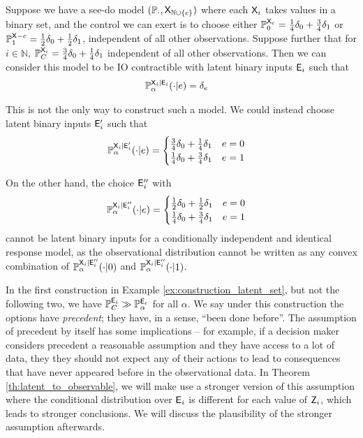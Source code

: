 \begin{example}\label{ex:construction_latent_set}
Suppose we have a see-do model $(\mathbb{P}_\cdot, \mathsf{X}_{\mathbb{N}\cup\{c\}})$ where each $\mathsf{X}_i$ takes values in a binary set, and the control we can exert is to choose either $\mathbb{P}_{0}^{\mathsf{X}_c} = \frac{1}{4}\delta_0 + \frac{3}{4}\delta_1$ or $\mathbb{P}_{1}^{\mathsf{X}-c} = \frac{1}{2}\delta_0 + \frac{1}{2}\delta_1$, independent of all other observations. Suppose further that for $i\in \mathbb{N}$, $\mathbb{P}_C^{\mathsf{X}_i}=\frac{3}{4}\delta_0 + \frac{1}{4}\delta_1$ independent of all other observations. Then we can consider this model to be IO contractible with latent binary inputs $\mathsf{E}_i$ such that
\begin{align}
	\mathbb{P}_\alpha^{\mathsf{X}_i|\mathsf{E}_i}(\cdot|e) &= \delta_e
\end{align}

This is not the only way to construct such a model. We could instead choose latent binary inputs $\mathsf{E}_i'$ such that
\begin{align}
	\mathbb{P}_\alpha^{\mathsf{X}_i|\mathsf{E}_i'}(\cdot|e) &= \begin{cases}
		\frac{3}{4}\delta_0 + \frac{1}{4}\delta_1 & e=0 \\
		\frac{1}{4}\delta_0 + \frac{3}{4}\delta_1 & e=1
	\end{cases}
\end{align}

On the other hand, the choice $\mathsf{E}_i^{\prime\prime}$ with
\begin{align}
	\mathbb{P}_\alpha^{\mathsf{X}_i|\mathsf{E}_i''}(\cdot|e) &= \begin{cases}
		\frac{1}{2}\delta_0 + \frac{1}{2}\delta_1 & e=0 \\
		\frac{1}{4}\delta_0 + \frac{3}{4}\delta_1 & e=1
	\end{cases}
\end{align}
cannot be latent binary inputs for a conditionally independent and identical response model, as the observational distribution cannot be written as any convex combination of $\mathbb{P}_\alpha^{\mathsf{X}_i|\mathsf{E}_i''}(\cdot|0)$ and $\mathbb{P}_\alpha^{\mathsf{X}_i|\mathsf{E}_i''}(\cdot|1)$.
\end{example}

In the first construction in Example \ref{ex:construction_latent_set}, but not the following two, we have $\mathbb{P}_C^{\mathsf{E}_i} \gg \mathbb{P}_\alpha^{\mathsf{E}_c}$ for all $\alpha$. We say under this construction the options have \emph{precedent}; they have, in a sense, ``been done before''. The assumption of precedent by itself has some implications -- for example, if a decision maker considers precedent a reasonable assumption and they have access to a lot of data, they they should not expect any of their actions to lead to consequences that have never appeared before in the observational data. In Theorem \ref{th:latent_to_observable}, we will make use a stronger version of this assumption where the conditional distribution over $\mathsf{E}_i$ is different for each value of $\mathsf{Z}_i$, which leads to stronger conclusions. We will discuss the plausibility of the stronger assumption afterwards.

